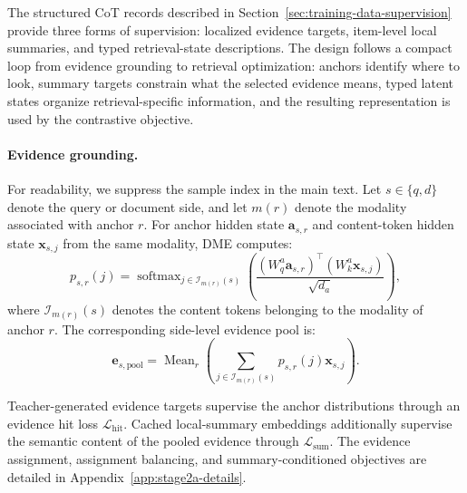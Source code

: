 The structured CoT records described in Section~\ref{sec:training-data-supervision} provide three forms of supervision: localized evidence targets, item-level local summaries, and typed retrieval-state descriptions. The design follows a compact loop from evidence grounding to retrieval optimization: anchors identify where to look, summary targets constrain what the selected evidence means, typed latent states organize retrieval-specific information, and the resulting representation is used by the contrastive objective.

\paragraph{Evidence grounding.}
For readability, we suppress the sample index in the main text. Let $s\in\{q,d\}$ denote the query or document side, and let $m(r)$ denote the modality associated with anchor $r$. For anchor hidden state $\mathbf{a}_{s,r}$ and content-token hidden state $\mathbf{x}_{s,j}$ from the same modality, DME computes:
\begin{equation}
    p_{s,r}(j)
    =
    \operatorname{softmax}_{
        j\in\mathcal{I}_{m(r)}(s)
    }
    \left(
        \frac{
            \left(
                W_q^{a}\mathbf{a}_{s,r}
            \right)^{\top}
            \left(
                W_k^{a}\mathbf{x}_{s,j}
            \right)
        }{
            \sqrt{d_a}
        }
    \right),
\end{equation}
where $\mathcal{I}_{m(r)}(s)$ denotes the content tokens belonging to the modality of anchor $r$. The corresponding side-level evidence pool is:
\begin{equation}
    \mathbf{e}_{s,\mathrm{pool}}
    =
    \operatorname{Mean}_{r}
    \left(
        \sum_{
            j\in\mathcal{I}_{m(r)}(s)
        }
        p_{s,r}(j)
        \mathbf{x}_{s,j}
    \right).
\label{eq:stage2a-evidence-pool}
\end{equation}

Teacher-generated evidence targets supervise the anchor distributions through an evidence hit loss $\mathcal{L}_{\mathrm{hit}}$. Cached local-summary embeddings additionally supervise the semantic content of the pooled evidence through $\mathcal{L}_{\mathrm{sum}}$. The evidence assignment, assignment balancing, and summary-conditioned objectives are detailed in Appendix~\ref{app:stage2a-details}.


